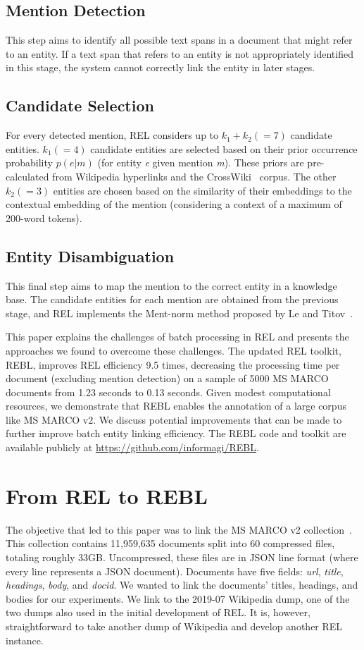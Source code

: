 \subsection{Mention Detection}
This step aims to identify all possible text spans in a document that might refer to an entity. If a text span that refers to an entity is not appropriately identified in this stage, the system cannot correctly link the entity in later stages.

\subsection{Candidate Selection} For every detected mention, REL considers up to $k_1 + k_2 (=7)$ candidate entities. $k_1 (=4)$ candidate entities are selected based on their prior occurrence probability $p(e|m)$ (for entity \textit{e} given mention \textit{m}). These priors are pre-calculated from Wikipedia hyperlinks and the CrossWiki~\cite{crosswiki} corpus. The other $k_2 (=3)$ entities are chosen based on the similarity of their embeddings to the contextual embedding of the mention (considering a context of a maximum of 200-word tokens).

\subsection{Entity Disambiguation} This final step aims to map the mention to the correct entity in a knowledge base. The candidate entities for each mention are obtained from the previous stage, and REL implements the Ment-norm method proposed by Le and Titov~\cite{ED-paper}. 

This paper explains the challenges of batch processing in REL and presents the approaches we found to overcome these challenges. The updated REL toolkit, REBL, improves REL efficiency 9.5 times, decreasing the processing time per document (excluding mention detection) on a sample of 5000 MS MARCO documents from 1.23 seconds to 0.13 seconds. Given modest computational resources, we demonstrate that REBL enables the annotation of a large corpus like MS MARCO v2. We discuss potential improvements that can be made to further improve batch entity linking efficiency. The REBL code and toolkit are available publicly at \url{https://github.com/informagi/REBL}.

\section{From REL to REBL}
The objective that led to this paper was to link the MS MARCO v2 collection~\cite{msmarco}. This collection contains 11,959,635 documents split into 60 compressed files, totaling roughly 33GB. Uncompressed, these files are in JSON line format (where every line represents a JSON document). Documents have five fields: \textit{url}, \textit{title}, \textit{headings}, \textit{body}, and \textit{docid}. We wanted to link the documents' titles, headings, and bodies for our experiments. We link to the 2019-07 Wikipedia dump, one of the two dumps also used in the initial development of REL. It is, however, straightforward to take another dump of Wikipedia and develop another REL instance. 

